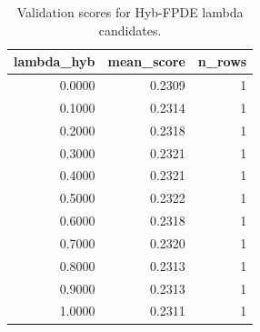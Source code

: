 \begin{table}[t]
\caption{Validation scores for Hyb-FPDE lambda candidates.}
\label{tab:lambda_distribution_computed}
\centering
\begin{tabular}{rrr}
\toprule
lambda\_hyb & mean\_score & n\_rows \\
\midrule
0.0000 & 0.2309 & 1 \\
0.1000 & 0.2314 & 1 \\
0.2000 & 0.2318 & 1 \\
0.3000 & 0.2321 & 1 \\
0.4000 & 0.2321 & 1 \\
0.5000 & 0.2322 & 1 \\
0.6000 & 0.2318 & 1 \\
0.7000 & 0.2320 & 1 \\
0.8000 & 0.2313 & 1 \\
0.9000 & 0.2313 & 1 \\
1.0000 & 0.2311 & 1 \\
\bottomrule
\end{tabular}

\end{table}
